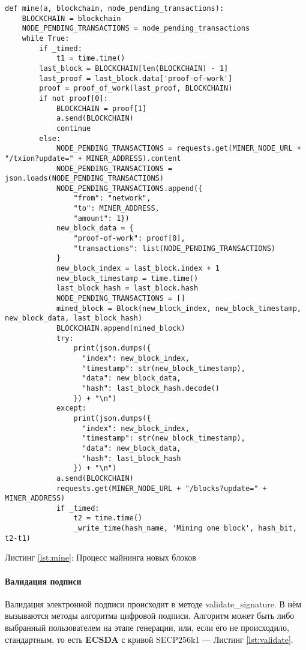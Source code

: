 \begin{center}
\begin{lstlisting}
def mine(a, blockchain, node_pending_transactions):
    BLOCKCHAIN = blockchain
    NODE_PENDING_TRANSACTIONS = node_pending_transactions
    while True:
        if _timed:
            t1 = time.time()
        last_block = BLOCKCHAIN[len(BLOCKCHAIN) - 1]
        last_proof = last_block.data['proof-of-work']
        proof = proof_of_work(last_proof, BLOCKCHAIN)
        if not proof[0]:
            BLOCKCHAIN = proof[1]
            a.send(BLOCKCHAIN)
            continue
        else:
            NODE_PENDING_TRANSACTIONS = requests.get(MINER_NODE_URL + "/txion?update=" + MINER_ADDRESS).content
            NODE_PENDING_TRANSACTIONS = json.loads(NODE_PENDING_TRANSACTIONS)
            NODE_PENDING_TRANSACTIONS.append({
                "from": "network",
                "to": MINER_ADDRESS,
                "amount": 1})
            new_block_data = {
                "proof-of-work": proof[0],
                "transactions": list(NODE_PENDING_TRANSACTIONS)
            }
            new_block_index = last_block.index + 1
            new_block_timestamp = time.time()
            last_block_hash = last_block.hash
            NODE_PENDING_TRANSACTIONS = []
            mined_block = Block(new_block_index, new_block_timestamp, new_block_data, last_block_hash)
            BLOCKCHAIN.append(mined_block)
            try:
                print(json.dumps({
                  "index": new_block_index,
                  "timestamp": str(new_block_timestamp),
                  "data": new_block_data,
                  "hash": last_block_hash.decode()
                }) + "\n")
            except:
                print(json.dumps({
                  "index": new_block_index,
                  "timestamp": str(new_block_timestamp),
                  "data": new_block_data,
                  "hash": last_block_hash
                }) + "\n")
            a.send(BLOCKCHAIN)
            requests.get(MINER_NODE_URL + "/blocks?update=" + MINER_ADDRESS)
            if _timed:
                t2 = time.time()
                _write_time(hash_name, 'Mining one block', hash_bit, t2-t1)
\end{lstlisting}\label{lst:mine}
    Листинг \ref{lst:mine}: Процесс майнинга новых блоков
\end{center}


\paragraph{Валидация подписи}
Валидация электронной подписи происходит в методе {\small validate\_signature}.
В нём вызываются методы алгоритма цифровой подписи. Алгоритм может быть либо
выбранный пользователем на этапе генерации, или, если его не происходило,
стандартным, то есть \textbf{ECSDA} с кривой  SECP256k1 --- Листинг
\ref{lst:validate}.


